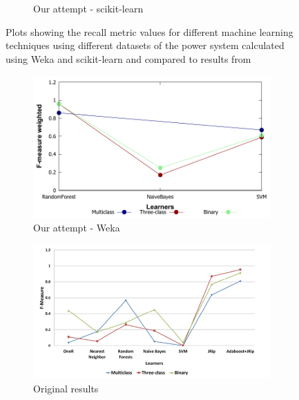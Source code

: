 \begin{figure}[H]
\begin{subfigure}[t]{110mm}
        \caption{Our attempt - scikit-learn}
    \end{subfigure}
    \caption{Plots showing the recall metric values for different machine learning techniques using different datasets of the power system calculated using Weka and scikit-learn and compared to results from \cite{borges_hink_machine_2014-1}}
    \label{fig:recall}
\end{figure}

\begin{figure}[H]
    \centering
    \begin{subfigure}[t]{110mm}
        \includegraphics[width=\linewidth]{images/weka_f1weight}
        \caption{Our attempt - Weka}
    \end{subfigure}
    \begin{subfigure}[t]{110mm}
        \includegraphics[width=\linewidth]{images/weka_f1_cite.png}
        \caption{Original results \cite{borges_hink_machine_2014-1}}
    \end{subfigure}
    \begin{subfigure}[t]{110mm}

\end{subfigure}
\end{figure}
